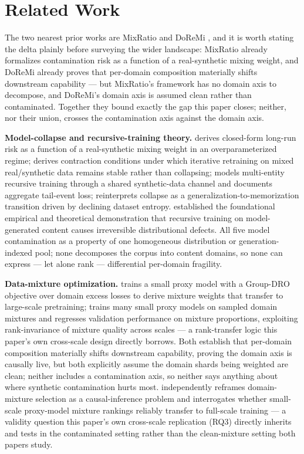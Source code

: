 \documentclass[11pt]{article}
\begin{document}
\section{Related Work}

The two nearest prior works are MixRatio \citep{MixRatio2023} and DoReMi \citep{DoReMi2023}, and it is worth stating the delta plainly before surveying the wider landscape: MixRatio already formalizes contamination risk as a function of a real-synthetic mixing weight, and DoReMi already proves that per-domain composition materially shifts downstream capability --- but MixRatio's framework has no domain axis to decompose, and DoReMi's domain axis is assumed clean rather than contaminated. Together they bound exactly the gap this paper closes; neither, nor their union, crosses the contamination axis against the domain axis.

\textbf{Model-collapse and recursive-training theory.} \citet{MixRatio2023} derives closed-form long-run risk as a function of a real-synthetic mixing weight in an overparameterized regime; \citet{IterStability2023} derives contraction conditions under which iterative retraining on mixed real/synthetic data remains stable rather than collapsing; \citet{CrossModelRecursion2023} models multi-entity recursive training through a shared synthetic-data channel and documents aggregate tail-event loss; \citet{EntropyCollapse2023} reinterprets collapse as a generalization-to-memorization transition driven by declining dataset entropy. \citet{Shumailov2024Collapse} established the foundational empirical and theoretical demonstration that recursive training on model-generated content causes irreversible distributional defects. All five model contamination as a property of one homogeneous distribution or generation-indexed pool; none decomposes the corpus into content domains, so none can express --- let alone rank --- differential per-domain fragility.

\textbf{Data-mixture optimization.} \citet{DoReMi2023} trains a small proxy model with a Group-DRO objective over domain excess losses to derive mixture weights that transfer to large-scale pretraining; \citet{RegMix2023} trains many small proxy models on sampled domain mixtures and regresses validation performance on mixture proportions, exploiting rank-invariance of mixture quality across scales --- a rank-transfer logic this paper's own cross-scale design directly borrows. Both establish that per-domain composition materially shifts downstream capability, proving the domain axis is causally live, but both explicitly assume the domain shards being weighted are clean; neither includes a contamination axis, so neither says anything about where synthetic contamination hurts most. \citet{CAUSALM} independently reframes domain-mixture selection as a causal-inference problem and \citet{CanSmallTraining} interrogates whether small-scale proxy-model mixture rankings reliably transfer to full-scale training --- a validity question this paper's own cross-scale replication (RQ3) directly inherits and tests in the contaminated setting rather than the clean-mixture setting both papers study.
\end{document}
